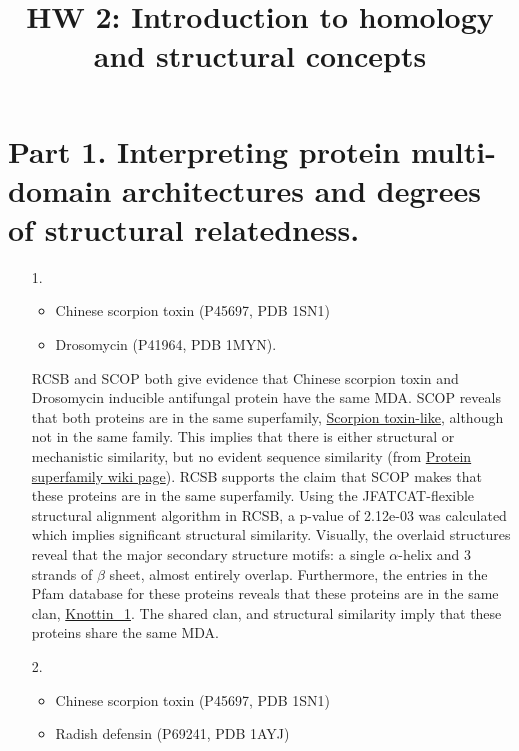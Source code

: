 \documentclass[11pt]{article}
\title{HW 2: Introduction to homology and structural concepts}
\author{\Name}%
\begin{document}
\maketitle

\section*{Part 1.  Interpreting protein multi-domain 
  architectures and degrees of structural relatedness.}

\begin{itemize}
\item[1.]
  \begin{itemize}
  \item Chinese scorpion toxin (P45697, PDB 1SN1)
  \item Drosomycin (P41964, PDB 1MYN).  
  \end{itemize}
  
  RCSB and SCOP both give evidence that Chinese scorpion toxin and 
  Drosomycin inducible antifungal protein
  have the same MDA. SCOP reveals that both proteins are 
  in the same superfamily, \href{http://scop.mrc-lmb.cam.ac.uk/scop/data/scop.b.h.c.h.html}{Scorpion toxin-like}, 
  although
  not in the same family. This implies that there is either structural or mechanistic
  similarity, but no evident sequence similarity 
  (from \href{http://en.wikipedia.org/wiki/Protein_superfamily}{Protein superfamily wiki page}).
  RCSB supports the claim that SCOP makes that these proteins are in the same superfamily. 
  Using the JFATCAT-flexible structural alignment algorithm in RCSB, a p-value of 2.12e-03 was
  calculated which implies significant structural similarity. Visually, the overlaid structures
  reveal that the major secondary structure motifs: a single $\alpha$-helix and 3 strands of $\beta$ sheet,
  almost entirely overlap.
  Furthermore, the entries in
  the Pfam database for these proteins reveals that these proteins are in the same clan, 
  \href{http://pfam.sanger.ac.uk/clan/Knottin_1}{Knottin\_1}. The shared clan, and structural
  similarity imply that these proteins share the same MDA.


\item[2.]
  \begin{itemize}
  \item Chinese scorpion toxin (P45697, PDB 1SN1)
  \item Radish defensin (P69241, PDB 1AYJ)
  \end{itemize}


\end{itemize}
\end{document}

